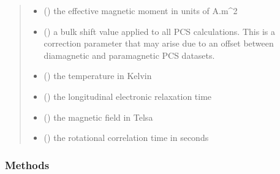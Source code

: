 \documentclass[a4paper,10pt,english,openany,oneside]{sphinxmanual}
\begin{document}
\begin{fulllineitems}
\begin{fulllineitems}
\begin{quote}
\begin{description}
\begin{itemize}
\item {} 
 () \textendash{} the effective magnetic moment in units of A.m\textasciicircum{}2

\item {} 
 () \textendash{} a bulk shift value applied to all PCS calculations.
This is a correction parameter that may arise due to an offset
between diamagnetic and paramagnetic PCS datasets.

\item {} 
 () \textendash{} the temperature in Kelvin

\item {} 
 () \textendash{} the longitudinal electronic relaxation time

\item {} 
 () \textendash{} the magnetic field in Telsa

\item {} 
 () \textendash{} the rotational correlation time in seconds

\end{itemize}

\end{description}\end{quote}
\subsubsection*{Methods}


\begin{savenotes}\sphinxatlongtablestart\begin{longtable}{}
\hline

\endfirsthead

%
{}\\
\hline

\endhead

\hline
{}\\
\endfoot


\end{longtable}
\end{savenotes}
\end{fulllineitems}
\end{fulllineitems}
\end{document}
